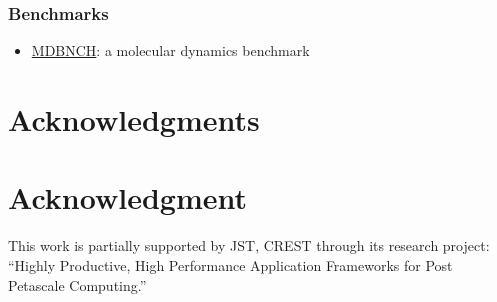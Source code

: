 \documentclass[a4paper,10pt,technote,compsoc,onecolumn]{IEEEtran}
\numberwithin{equation}{section}
\begin{document}
\subsubsection{Benchmarks}
\begin{itemize}
  \item \href{http://www.fisica.uniud.it/~ercolessi/mdbnch.html}{MDBNCH}: a
  molecular dynamics benchmark
\end{itemize}


\ifCLASSOPTIONcompsoc
  \section*{Acknowledgments}
\else
  \section*{Acknowledgment}
\fi
This work is partially supported by JST, CREST through its research project:
``Highly Productive, High Performance Application Frameworks for Post 
Petascale Computing.''

\ifCLASSOPTIONcaptionsoff
  \newpage
\fi






% 
\end{document}
